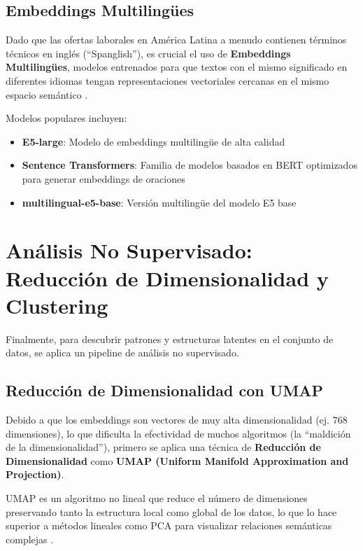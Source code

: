 \subsection{Embeddings Multilingües}

Dado que las ofertas laborales en América Latina a menudo contienen términos técnicos en inglés (``Spanglish''), es crucial el uso de \textbf{Embeddings Multilingües}, modelos entrenados para que textos con el mismo significado en diferentes idiomas tengan representaciones vectoriales cercanas en el mismo espacio semántico \parencite{echeverria2022, kavas2024}.

Modelos populares incluyen:

\begin{itemize}
    \item \textbf{E5-large}: Modelo de embeddings multilingüe de alta calidad
    \item \textbf{Sentence Transformers}: Familia de modelos basados en BERT optimizados para generar embeddings de oraciones
    \item \textbf{multilingual-e5-base}: Versión multilingüe del modelo E5 base
\end{itemize}

\section{Análisis No Supervisado: Reducción de Dimensionalidad y Clustering}

Finalmente, para descubrir patrones y estructuras latentes en el conjunto de datos, se aplica un pipeline de análisis no supervisado.

\subsection{Reducción de Dimensionalidad con UMAP}

Debido a que los embeddings son vectores de muy alta dimensionalidad (ej. 768 dimensiones), lo que dificulta la efectividad de muchos algoritmos (la ``maldición de la dimensionalidad''), primero se aplica una técnica de \textbf{Reducción de Dimensionalidad} como \textbf{UMAP (Uniform Manifold Approximation and Projection)}.

UMAP es un algoritmo no lineal que reduce el número de dimensiones preservando tanto la estructura local como global de los datos, lo que lo hace superior a métodos lineales como PCA para visualizar relaciones semánticas complejas \parencite{lukauskas2023}.

